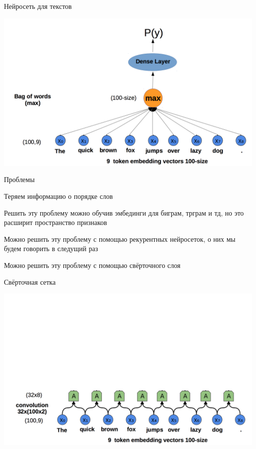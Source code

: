 \documentclass[notes,12pt, aspectratio=169]{beamer}
\newenvironment{wideitemize}{\itemize\addtolength{\itemsep}{10pt}}{\enditemize}
\begin{document}
\begin{frame}{Нейросеть для текстов}
\begin{center}
	\includegraphics[width=.75\linewidth]{text_nn.png}
\end{center}
\end{frame} 


\begin{frame}{Проблемы}
\begin{wideitemize} 
	\item  Теряем информацию о порядке слов 
	\item  Решить эту проблему можно обучив эмбединги для биграм, трграм и тд, но это расширит пространство признаков
	\item  Можно решить эту проблему с помощью рекурентных нейросеток, о них мы будем говорить в следущий раз 
	\item  \alert{Можно решить эту проблему с помощью свёрточного слоя}
\end{wideitemize} 
\end{frame} 


\begin{frame}{Свёрточная сетка}
\begin{center}
	\includegraphics[width=.75\linewidth]{conv1.png}
\end{center}
\end{frame} 
\end{document}
